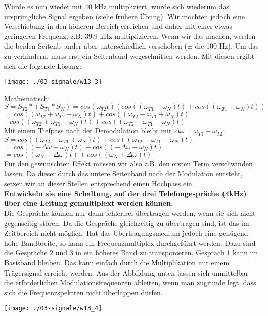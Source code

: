 Würde es nun wieder mit 40 kHz multipliziert, würde sich wiederum das ursprüngliche Signal ergeben (siehe frühere Übung). 
Wir möchten jedoch eine Verschiebung in den höheren Bereich erreichen und daher mit einer etwas geringeren Frequenz, z.B. 39.9 kHz multiplizieren. 
Wenn wir das machen, werden die beiden Seitenb¨ander aber unterschiedlich verschoben (± die 100 Hz). Um das zu verhindern, muss erst ein Seitenband wegeschnitten werden. 
Mit diesen ergibt sich die folgende Lösung:
\begin{center}
    \vspace{-8pt}
    \texttt{[image: ./03-signale/w13\_3]}
    \vspace{-8pt}
\end{center}

Mathematisch:\\
$S=S_{T2}*(S_{T1}*S_N)=cos(\omega_{T2}t)(cos((\omega_{T1}-\omega_N)t)+cos((\omega_{T1}+\omega_N)t))$\\
$=cos((\omega_{T2}+\omega_{T1}-\omega_N)t)+cos((\omega_{T2}-\omega_{T1}+\omega_N)t)$\\
$+cos((\omega_{T2}+\omega_{T1}+\omega_N)t)+cos((\omega_{T2}-\omega_{T1}-\omega_N)t)$\\

Mit einem Tiefpass nach der Demodulation bleibt mit $\Delta \omega = \omega_{T1}-\omega_{T2}$:\\
$S=cos((\omega_{T2}-\omega_{T1}+\omega_N)t)+cos((\omega_{T2}-\omega_{T1}-\omega_N)t)$\\
$=cos((-\Delta \omega + \omega_N)t)+cos((-\Delta \omega -\omega_N)t)$\\
$=cos((\omega_N-\Delta \omega)t)+cos((\omega_N+\Delta \omega)t)$\\

Für den gewünschten Effekt müssen wir also z.B. den ersten Term verschwinden lassen. Da dieser durch das untere Seitenband nach der Modulation entsteht,
setzen wir an dieser Stellen entsprechend einen Hochpass ein.\\

\textbf{Entwickeln sie eine Schaltung, auf der drei Telefongespräche (4kHz) über eine Leitung gemultiplext werden können.}\\
Die Gespräche können nur dann fehlerfrei übertragen werden, wenn sie sich nicht gegenseitig stören. Da die Gespräche gleichzeitig zu übertragen sind, ist das im Zeitbereich nicht möglich. 
Hat das Übertragungsmedium jedoch eine genügend hohe Bandbreite, so kann ein Frequenzmultiplex durchgeführt werden. Dazu sind die Gespräche 2 und 3 in ein höheres Band zu transponieren. Gespräch 1 kann im Basisband bleiben. 
Das kann einfach durch die Multiplikation mit einem Trägersignal erreicht werden. Aus der Abbildung unten lassen sich unmittelbar die erforderlichen Modulationsfrequenzen ableiten, wenn man zugrunde legt, dass
sich die Frequenzspektren nicht überlappen dürfen.
\begin{center}
    \vspace{-8pt}
    \texttt{[image: ./03-signale/w13\_4]}
    \vspace{-8pt}
\end{center}

